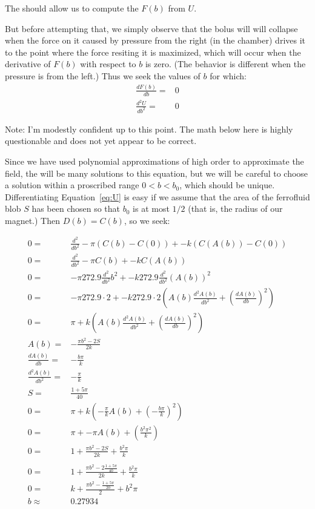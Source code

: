 \documentclass[]{asme2ej}
\begin{document}
The should allow us to compute the $F(b)$ from $U$.

But before attempting that, we simply observe that the bolus will will collapse when the force on
it caused by pressure from the right (in the chamber) drives it to the point where the force
resiting it is maximized, which will occur when the derivative of $F(b)$ with respect to $b$ is
zero. (The behavior is different when the pressure is from the left.)
Thus we seek the values of $b$ for which:
\begin{align}
  \frac{d F(b)}{db} = & 0 \\
  \frac{d^2 U}{db^2} = & 0
\end{align}

Note: I'm modestly confident up to this point. The math below here is highly questionable
and does not yet appear to be correct.

Since we have used polynomial approximations of high order to approximate the field,
the will be many solutions to this equation, but we will be careful to choose a solution
within a proscribed range $0 < b < b_0$, which should be unique.
Differentiating Equation~\ref{eq:U} is easy if we assume that the area of the ferrofluid
blob $S$ has been chosen so that $b_0$ is at most $1/2$ (that is, the radius of our
magnet.) Then $D(b) = C(b)$, so we seek:

\begin{align}
  0 = & \frac{d^2 }{db^2} -\pi (C(b) - C(0)) + -k (C(A(b)) - C(0)) \\
  0 = & \frac{d^2 }{db^2} -\pi C(b) + -k C(A(b)) \\
  0 = &  -\pi 272.9 \frac{d^2 }{db^2} b^2 + -k 272.9 \frac{d^2 }{db^2}(A(b))^2 \\
  0 = &  -\pi 272.9 \cdot 2 + -k 272.9 \cdot 2 ( A(b)  \frac{d^2 A(b)}{db^2} +  (\frac{d A(b)}{db})^2) \\
  0 = &  \pi + k ( A(b)  \frac{d^2 A(b)}{db^2} +  (\frac{d A(b)}{db})^2) \\
  A(b) = & -\frac{\pi b^2 - 2 S}{2k} \\
  \frac{d A(b)}{db} = & -\frac{b \pi}{k} \\
  \frac{d^2 A(b)}{db^2} = &   -\frac{\pi}{k} \\
  S = & \frac{1 + 5 \pi}{40} \\
  0 = &  \pi + k ( -\frac{\pi}{k} A(b)   +  (-\frac{b \pi}{k})^2) \\
  0 = &  \pi +  -\pi A(b)   +  (\frac{b^2 \pi^2}{k}) \\
  0 = &  1 +  \frac{\pi b^2 - 2 S}{2k}  +  \frac{b^2 \pi}{k} \\
  \\
  0 = &  1 +  \frac{\pi b^2 - 2 \frac{1 + 5 \pi}{40}}{2k}  +  \frac{b^2 \pi}{k} \\
  0 = &  k +  \frac{\pi b^2 -  \frac{1 + 5 \pi}{20}}{2}  +  b^2 \pi \\
  b \approx & 0.27934
\end{align}
\end{document}
